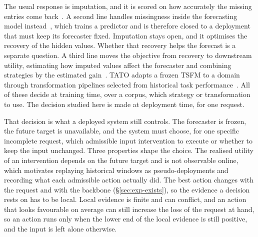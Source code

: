 \documentclass{article}
\newcommand{\tsfm}{TSFM}
\begin{document}
The usual response is imputation, and it is scored on how accurately the missing entries come
back~\citep{cao2018brits,tashiro2021csdi,du2023saits}. A second line handles missingness inside
the forecasting model instead~\citep{chen2024bitgraph,peng2025s4m}, which trains a predictor and
is therefore closed to a deployment that must keep its forecaster fixed. Imputation stays open, and it
optimises the recovery of the hidden values. Whether that recovery helps the forecast is a
separate question. A third line moves the objective from recovery to downstream utility, estimating
how imputed values affect the forecaster and combining strategies by the estimated
gain~\citep{wang2024taskoriented,hao2025toivsf,xu2026srdi}. TATO adapts a frozen \tsfm{} to a
domain through transformation pipelines selected from historical task
performance~\citep{qiu2026tato}. All of these decide at training time, over a corpus, which
strategy or transformation to use. The decision studied here is made at deployment time, for
one request.

That decision is what a deployed system still controls. The forecaster is frozen, the
future target is unavailable, and the system must choose, for one specific incomplete request,
which admissible input intervention to execute or whether to keep the input unchanged. Three
properties shape the choice. The realised utility of an intervention depends on the future
target and is not observable online, which motivates replaying historical windows as
pseudo-deployments and recording what each admissible action actually did. The best action
changes with the request and with the backbone (\S\ref{sec:exp-exists}), so the evidence a
decision rests on has to be local. Local evidence is finite and can
conflict, and an action that looks favourable on average can still increase the loss of the
request at hand, so an action runs only when the lower end of the local evidence is still
positive, and the input is left alone otherwise.
\end{document}
